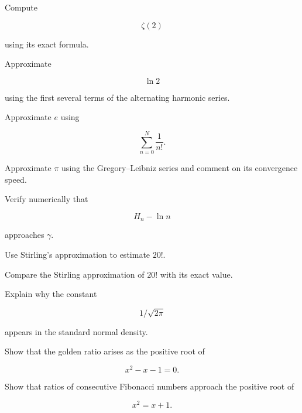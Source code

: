 \begin{exercise}[2]
Compute

\[
\zeta(2)
\]

using its exact formula.
\end{exercise}

\begin{exercise}[2]
Approximate

\[
\ln2
\]

using the first several terms of the alternating harmonic series.
\end{exercise}

\begin{exercise}[3]
Approximate \(e\) using

\[
\sum_{n=0}^{N}
\frac1{n!}.
\]
\end{exercise}

\begin{exercise}[3]
Approximate \(\pi\) using the Gregory--Leibniz series and comment on its
convergence speed.
\end{exercise}

\begin{exercise}[3]
Verify numerically that

\[
H_n-\ln n
\]

approaches \(\gamma\).
\end{exercise}

\begin{exercise}[3]
Use Stirling's approximation to estimate \(20!\).
\end{exercise}

\begin{exercise}[3]
Compare the Stirling approximation of \(20!\) with its exact value.
\end{exercise}

\begin{exercise}[3]
Explain why the constant

\[
1/\sqrt{2\pi}
\]

appears in the standard normal density.
\end{exercise}

\begin{exercise}[3]
Show that the golden ratio arises as the positive root of

\[
x^2-x-1=0.
\]
\end{exercise}

\begin{exercise}[3]
Show that ratios of consecutive Fibonacci numbers approach the positive root
of

\[
x^2=x+1.
\]
\end{exercise}

